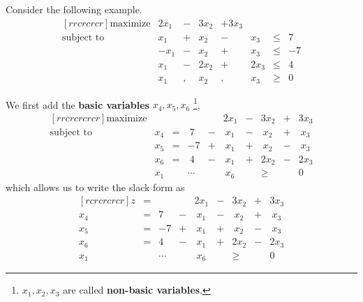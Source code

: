 \begin{example}
    Consider the following example. \[
        \begin{matrix}[rrcrcrcr]
            \text{maximize}   & 2x_1 & - & 3x_2 & + 3x_3 &      &      &    \\
            \text{subject to} & x_1  & + & x_2  & -      & x_3  & \leq & 7  \\
                              & -x_1 & - & x_2  & +      & x_3  & \leq & -7 \\
                              & x_1  & - & 2x_2 & +      & 2x_3 & \leq & 4  \\
                              & x_1  & , & x_2  & ,      & x_3  & \geq & 0
        \end{matrix}
    \]

    We first add the \textbf{basic variables} $x_4, x_5, x_6$ \footnote{$x_1, x_2, x_3$ are called \textbf{non-basic variables}.}, \[
        \begin{matrix}[rrcrcrcrcr]
            \text{maximize}   &     &   &        &   & 2x_1 & - & 3x_2 & + & 3x_3 \\
            \text{subject to} & x_4 & = & ~7     & - & ~x_1 & - & ~x_2 & + & ~x_3 \\
                              & x_5 & = & -7     & + & ~x_1 & + & ~x_2 & - & ~x_3 \\
                              & x_6 & = & ~4     & - & ~x_1 & + & 2x_2 & - & 2x_3 \\
                              & x_1 &   & \cdots &   & ~x_6 &   & \ge  &   & 0
        \end{matrix}
    \] which allows us to write the slack form as \[
        \begin{matrix}[rcrcrcrcr]
            z   & = &        &   & 2x_1 & - & 3x_2 & + & 3x_3 \\
            x_4 & = & 7~     & - & ~x_1 & - & ~x_2 & + & ~x_3 \\
            x_5 & = & -7     & + & ~x_1 & + & ~x_2 & - & ~x_3 \\
            x_6 & = & 4~     & - & ~x_1 & + & 2x_2 & - & 2x_3 \\
            x_1 &   & \cdots &   & ~x_6 &   & \ge  &   & 0
        \end{matrix}
    \]
\end{example}

